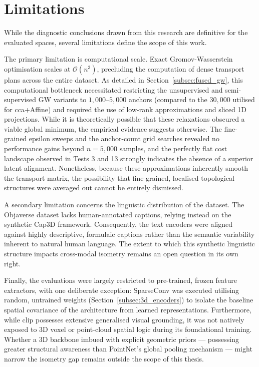 \section{Limitations}
\label{sec:limitations}

While the diagnostic conclusions drawn from this research are definitive for the evaluated spaces, several limitations define the scope of this work.

The primary limitation is computational scale. Exact Gromov-Wasserstein optimisation scales at $\mathcal{O}(n^3)$, precluding the computation of dense transport plans across the entire dataset. As detailed in Section~\ref{subsec:fused_gw}, this computational bottleneck necessitated restricting the unsupervised and semi-supervised GW variants to $1{,}000$--$5{,}000$ anchors (compared to the $30{,}000$ utilised for \gls{cca}+Affine) and required the use of low-rank approximations and sliced 1D projections. While it is theoretically possible that these relaxations obscured a viable global minimum, the empirical evidence suggests otherwise. The fine-grained epsilon sweeps and the anchor-count grid searches revealed no performance gains beyond $n{=}5{,}000$ samples, and the perfectly flat cost landscape observed in Tests 3 and 13 strongly indicates the absence of a superior latent alignment. Nonetheless, because these approximations inherently smooth the transport matrix, the possibility that fine-grained, localised topological structures were averaged out cannot be entirely dismissed.

A secondary limitation concerns the linguistic distribution of the dataset. The Objaverse dataset lacks human-annotated captions, relying instead on the synthetic Cap3D framework. Consequently, the text encoders were aligned against highly descriptive, formulaic captions rather than the semantic variability inherent to natural human language. The extent to which this synthetic linguistic structure impacts cross-modal isometry remains an open question in its own right.

Finally, the evaluations were largely restricted to pre-trained, frozen feature extractors, with one deliberate exception: SparseConv was executed utilising random, untrained weights (Section~\ref{subsec:3d_encoders}) to isolate the baseline spatial covariance of the architecture from learned representations. Furthermore, while \gls{clip} possesses extensive generalised visual grounding, it was not natively exposed to 3D voxel or point-cloud spatial logic during its foundational training. Whether a 3D backbone imbued with explicit geometric priors --- possessing greater structural awareness than PointNet's global pooling mechanism --- might narrow the isometry gap remains outside the scope of this thesis.

